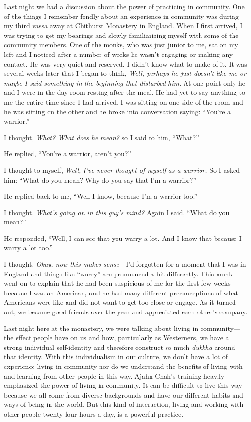 Last night we had a discussion about the power of practicing in 
community. One of the things I remember fondly about an experience in 
community was during my third vassa away at Chithurst Monastery in 
England. When I first arrived, I was trying to get my bearings and 
slowly familiarizing myself with some of the community members. One of 
the monks, who was just junior to me, sat on my left and I noticed 
after a number of weeks he wasn't engaging or making any contact. He 
was very quiet and reserved. I didn't know what to make of it. It was 
several weeks later that I began to think, \emph{Well, perhaps he just 
doesn't like me or maybe I said something in the beginning that 
disturbed him.} At one point only he and I were in the day room resting 
after the meal. He had yet to say anything to me the entire time since 
I had arrived. I was sitting on one side of the room and he was sitting 
on the other and he broke into conversation saying: ``You're a 
warrior.''

I thought, \emph{What? What does he mean?} so I said to him, ``What?''

He replied, ``You're a warrior, aren't you?''

I thought to myself, \emph{Well, I've never thought of myself as a 
warrior.} So I asked him: ``What do you mean? Why do you say that I'm a 
warrior?''

He replied back to me, ``Well I know, because I'm a warrior too.''

I thought, \emph{What's going on in this guy's mind?} Again I said, 
``What do you mean?''

He responded, ``Well, I can see that you warry a lot. And I know that 
because I warry a lot too.''

I thought, \emph{Okay, now this makes sense}---I'd forgotten for a 
moment that I was in England and things like ``worry'' are pronounced a 
bit differently. This monk went on to explain that he had been 
suspicious of me for the first few weeks because I was an American, and 
he had many different preconceptions of what Americans were like and 
did not want to get too close or engage. As it turned out, we became 
good friends over the year and appreciated each other's company.

Last night here at the monastery, we were talking about living in 
community---the effect people have on us and how, particularly as 
Westerners, we have a strong individual self-identity and therefore 
construct so much \emph{dukkha} around that identity. With this 
individualism in our culture, we don't have a lot of experience living 
in community nor do we understand the benefits of living with and 
learning from other people in this way. Ajahn Chah's training heavily 
emphasized the power of living in community. It can be difficult to 
live this way because we all come from diverse backgrounds and have our 
different habits and ways of being in the world. But this kind of 
interaction, living and working with other people twenty-four hours a 
day, is a powerful practice.

